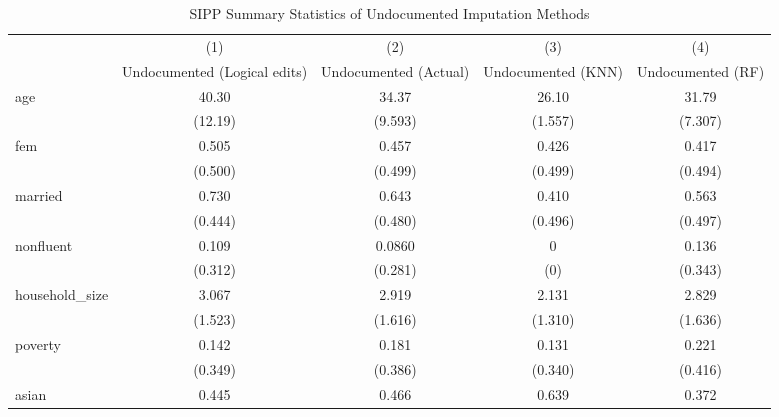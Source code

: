 \begin{table}[htbp]\centering
\def\sym#1{\ifmmode^{#1}\else\(^{#1}\)\fi}
\caption{SIPP Summary Statistics of Undocumented Imputation Methods \label{tab:sum}}
\begin{tabular}{l*{4}{c}}
\hline\hline
                    &\multicolumn{1}{c}{(1)}         &\multicolumn{1}{c}{(2)}         &\multicolumn{1}{c}{(3)}         &\multicolumn{1}{c}{(4)}         \\
                    &Undocumented (Logical edits)         &Undocumented (Actual)         &Undocumented (KNN)         &Undocumented (RF)         \\
\hline
age                 &       40.30         &       34.37         &       26.10         &       31.79         \\
                    &     (12.19)         &     (9.593)         &     (1.557)         &     (7.307)         \\
[1em]
fem                 &       0.505         &       0.457         &       0.426         &       0.417         \\
                    &     (0.500)         &     (0.499)         &     (0.499)         &     (0.494)         \\
[1em]
married             &       0.730         &       0.643         &       0.410         &       0.563         \\
                    &     (0.444)         &     (0.480)         &     (0.496)         &     (0.497)         \\
[1em]
nonfluent           &       0.109         &      0.0860         &           0         &       0.136         \\
                    &     (0.312)         &     (0.281)         &         (0)         &     (0.343)         \\
[1em]
household\_size      &       3.067         &       2.919         &       2.131         &       2.829         \\
                    &     (1.523)         &     (1.616)         &     (1.310)         &     (1.636)         \\
[1em]
poverty             &       0.142         &       0.181         &       0.131         &       0.221         \\
                    &     (0.349)         &     (0.386)         &     (0.340)         &     (0.416)         \\
[1em]
asian               &       0.445         &       0.466         &       0.639         &       0.372         \\

\end{tabular}
\end{table}
